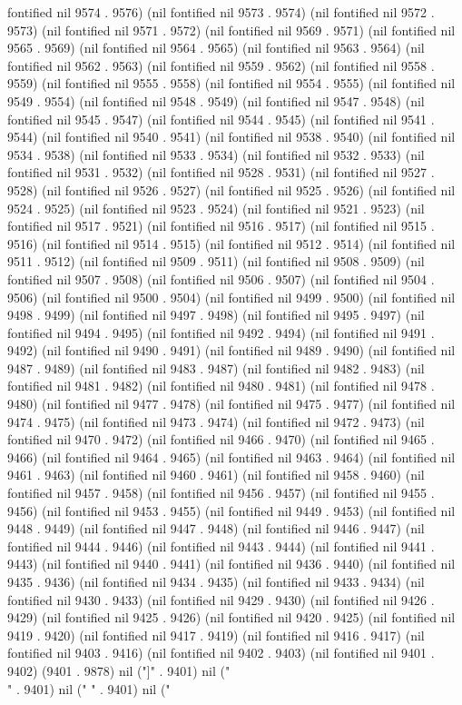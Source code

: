 {{fontified nil 9574 . 9576) (nil fontified nil 9573 . 9574) (nil fontified nil 9572 . 9573) (nil fontified nil 9571 . 9572) (nil fontified nil 9569 . 9571) (nil fontified nil 9565 . 9569) (nil fontified nil 9564 . 9565) (nil fontified nil 9563 . 9564) (nil fontified nil 9562 . 9563) (nil fontified nil 9559 . 9562) (nil fontified nil 9558 . 9559) (nil fontified nil 9555 . 9558) (nil fontified nil 9554 . 9555) (nil fontified nil 9549 . 9554) (nil fontified nil 9548 . 9549) (nil fontified nil 9547 . 9548) (nil fontified nil 9545 . 9547) (nil fontified nil 9544 . 9545) (nil fontified nil 9541 . 9544) (nil fontified nil 9540 . 9541) (nil fontified nil 9538 . 9540) (nil fontified nil 9534 . 9538) (nil fontified nil 9533 . 9534) (nil fontified nil 9532 . 9533) (nil fontified nil 9531 . 9532) (nil fontified nil 9528 . 9531) (nil fontified nil 9527 . 9528) (nil fontified nil 9526 . 9527) (nil fontified nil 9525 . 9526) (nil fontified nil 9524 . 9525) (nil fontified nil 9523 . 9524) (nil fontified nil 9521 . 9523) (nil fontified nil 9517 . 9521) (nil fontified nil 9516 . 9517) (nil fontified nil 9515 . 9516) (nil fontified nil 9514 . 9515) (nil fontified nil 9512 . 9514) (nil fontified nil 9511 . 9512) (nil fontified nil 9509 . 9511) (nil fontified nil 9508 . 9509) (nil fontified nil 9507 . 9508) (nil fontified nil 9506 . 9507) (nil fontified nil 9504 . 9506) (nil fontified nil 9500 . 9504) (nil fontified nil 9499 . 9500) (nil fontified nil 9498 . 9499) (nil fontified nil 9497 . 9498) (nil fontified nil 9495 . 9497) (nil fontified nil 9494 . 9495) (nil fontified nil 9492 . 9494) (nil fontified nil 9491 . 9492) (nil fontified nil 9490 . 9491) (nil fontified nil 9489 . 9490) (nil fontified nil 9487 . 9489) (nil fontified nil 9483 . 9487) (nil fontified nil 9482 . 9483) (nil fontified nil 9481 . 9482) (nil fontified nil 9480 . 9481) (nil fontified nil 9478 . 9480) (nil fontified nil 9477 . 9478) (nil fontified nil 9475 . 9477) (nil fontified nil 9474 . 9475) (nil fontified nil 9473 . 9474) (nil fontified nil 9472 . 9473) (nil fontified nil 9470 . 9472) (nil fontified nil 9466 . 9470) (nil fontified nil 9465 . 9466) (nil fontified nil 9464 . 9465) (nil fontified nil 9463 . 9464) (nil fontified nil 9461 . 9463) (nil fontified nil 9460 . 9461) (nil fontified nil 9458 . 9460) (nil fontified nil 9457 . 9458) (nil fontified nil 9456 . 9457) (nil fontified nil 9455 . 9456) (nil fontified nil 9453 . 9455) (nil fontified nil 9449 . 9453) (nil fontified nil 9448 . 9449) (nil fontified nil 9447 . 9448) (nil fontified nil 9446 . 9447) (nil fontified nil 9444 . 9446) (nil fontified nil 9443 . 9444) (nil fontified nil 9441 . 9443) (nil fontified nil 9440 . 9441) (nil fontified nil 9436 . 9440) (nil fontified nil 9435 . 9436) (nil fontified nil 9434 . 9435) (nil fontified nil 9433 . 9434) (nil fontified nil 9430 . 9433) (nil fontified nil 9429 . 9430) (nil fontified nil 9426 . 9429) (nil fontified nil 9425 . 9426) (nil fontified nil 9420 . 9425) (nil fontified nil 9419 . 9420) (nil fontified nil 9417 . 9419) (nil fontified nil 9416 . 9417) (nil fontified nil 9403 . 9416) (nil fontified nil 9402 . 9403) (nil fontified nil 9401 . 9402) (9401 . 9878) nil ("]" . 9401) nil ("\\" . 9401) nil (" " . 9401) nil ("
}}
